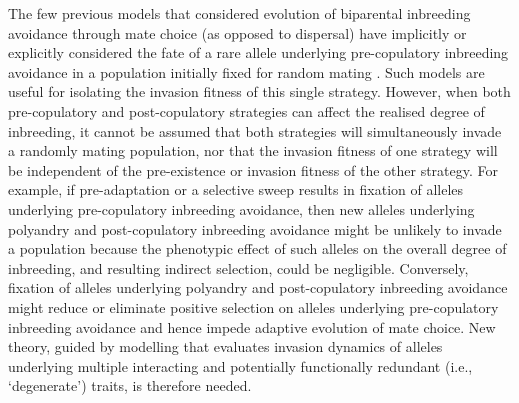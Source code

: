 \documentclass[12pt]{article}
\begin{document}
The few previous models that considered evolution of biparental inbreeding avoidance through mate choice (as opposed to dispersal) have implicitly or explicitly considered the fate of a rare allele underlying pre-copulatory inbreeding avoidance in a population initially fixed for random mating \cite[e.g.,][]{Parker1979, Parker2006, Duthie, Duthie2016a}. Such models are useful for isolating the invasion fitness of this single strategy. However, when both pre-copulatory and post-copulatory strategies can affect the realised degree of inbreeding, it cannot be assumed that both strategies will simultaneously invade a randomly mating population, nor that the invasion fitness of one strategy will be independent of the pre-existence or invasion fitness of the other strategy. For example, if pre-adaptation or a selective sweep results in fixation of alleles underlying pre-copulatory inbreeding avoidance, then new alleles underlying polyandry and post-copulatory inbreeding avoidance might be unlikely to invade a population because the phenotypic effect of such alleles on the overall degree of inbreeding, and resulting indirect selection, could be negligible. Conversely, fixation of alleles underlying polyandry and post-copulatory inbreeding avoidance might reduce or eliminate positive selection on alleles underlying pre-copulatory inbreeding avoidance and hence impede adaptive evolution of mate choice. New theory, guided by modelling that evaluates invasion dynamics of alleles underlying multiple interacting and potentially functionally redundant (i.e., `degenerate') traits, is therefore needed.
\end{document}
